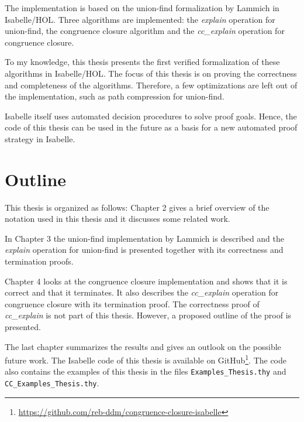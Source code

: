 The implementation is based on the union-find formalization by Lammich \cite{unionfind-isabelle} in Isabelle/HOL. Three algorithms are implemented: the \emph{explain} operation for union-find, the congruence closure algorithm and the \emph{cc\_explain} operation for congruence closure.

To my knowledge, this thesis presents the first verified formalization of these algorithms in Isabelle/HOL.
The focus of this thesis is on proving the correctness and completeness of the algorithms.
Therefore, a few optimizations are left out of the implementation, such as path compression for union-find.

Isabelle itself uses automated decision procedures to solve proof goals.
Hence, the code of this thesis can be used in the future as a basis for a new automated proof strategy in Isabelle.

\section{Outline}
This thesis is organized as follows: Chapter 2 gives a brief overview of the notation used in this thesis and it discusses some related work.

In Chapter 3 the union-find implementation by Lammich \cite{unionfind-isabelle} is described and the \emph{explain} operation for union-find is presented together with its correctness and termination proofs.

Chapter 4 looks at the congruence closure implementation and shows that it is correct and that it terminates. It also describes the \emph{cc\_explain} operation for congruence closure with its termination proof. The correctness proof of \emph{cc\_explain} is not part of this thesis. However, a proposed outline of the proof is presented.

The last chapter summarizes the results and gives an outlook on the possible future work.
The Isabelle code of this thesis is available on GitHub\footnote{\url{https://github.com/reb-ddm/congruence-closure-isabelle}}.
The code also contains the examples of this thesis in the files \lstinline|Examples_Thesis.thy| and \lstinline|CC_Examples_Thesis.thy|.

